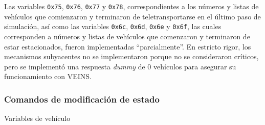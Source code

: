 \begin{description}[style=multiline]
    Las variables \texttt{0x75}, \texttt{0x76}, \texttt{0x77} y \texttt{0x78}, correspondientes a los números y listas de vehículos que comienzaron y terminaron de teletransportarse en el último paso de simulación, así como las variables \texttt{0x6c}, \texttt{0x6d}, \texttt{0x6e} y \texttt{0x6f}, las cuales corresponden a números y listas de vehículos que comenzaron y terminaron de estar estacionados, fueron implementadas ``parcialmente''. En estricto rigor, los mecanismos subyacentes no se implementaron porque no se consideraron críticos, pero se implementó una respuesta \emph{dummy} de 0 vehículos para asegurar su funcionamiento con VEINS.
    
\end{description}

\subsubsection{Comandos de modificación de estado}\label{sec:mod_state}

\begin{description}[style=multiline]
    \item [\texttt{0xc4}] Variables de vehículo
    \begin{multicols}{2}
        \begin{itemize}
            
        \end{itemize}
    \end{multicols}
\end{description}